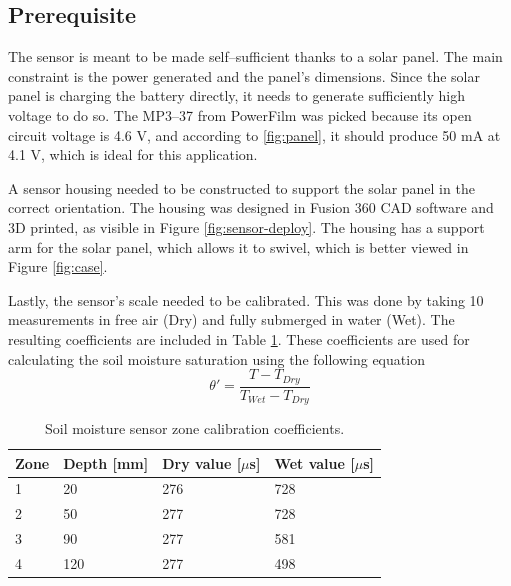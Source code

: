 \subsection{Prerequisite}
The sensor is meant to be made self--sufficient thanks to a solar panel. The main constraint is the power generated and the panel's dimensions. Since the solar panel is charging the battery directly, it needs to generate sufficiently high voltage to do so. The MP3--37 from PowerFilm was picked because its open circuit voltage is 4.6 V, and according to \ref{fig:panel}, it should produce 50 mA at 4.1 V, which is ideal for this application.


A sensor housing needed to be constructed to support the solar panel in the correct orientation. The housing was designed in Fusion 360 CAD software and 3D printed, as visible in Figure \ref{fig:sensor-deploy}. The housing has a support arm for the solar panel, which allows it to swivel, which is better viewed in Figure \ref{fig:case}.

Lastly, the sensor's scale needed to be calibrated. This was done by taking 10 measurements in free air (Dry) and fully submerged in water (Wet). The resulting coefficients are included in Table \ref{table:sensor-calibration}. These coefficients are used for calculating the soil moisture saturation using the following equation
\begin{equation}
    \theta' = \dfrac{T - T_{Dry}}{T_{Wet} - T_{Dry}}
\end{equation}

\begin{table}
\begin{center}
\caption{\label{table:sensor-calibration}Soil moisture sensor zone calibration coefficients.}
    \begin{tabular}{|l|l|l|l|} \hline
    \textbf{Zone} & \textbf{Depth [mm]} & \textbf{Dry value [$\mu$s]} & \textbf{Wet value [$\mu$s]} \\ \hline
    1 & 20 & 276 & 728 \\ \hline
    2 & 50 & 277 & 728 \\ \hline
    3 & 90 & 277 & 581 \\ \hline
    4 & 120 & 277 & 498 \\ \hline
    \end{tabular}
\end{center}
\end{table}

